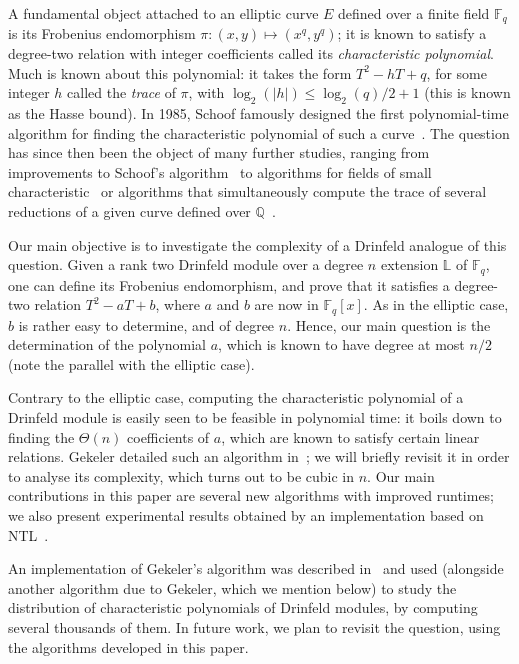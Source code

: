 \documentclass[sigconf]{acmart}
\newcommand{\Q}{\mathbb{Q}}
\newcommand{\F}{\mathbb{F}}
\renewcommand{\L}{\mathbb{L}}
\begin{document}
A fundamental object attached to an elliptic curve $E$ defined over a
finite field $\F_q$ is its Frobenius endomorphism $\pi:(x,y) \mapsto
(x^q,y^q)$; it is known to satisfy a degree-two relation with integer
coefficients called its {\em characteristic polynomial}. Much is known
about this polynomial: it takes the form $T^2 - h T + q$, for some
integer $h$ called the {\em trace} of $\pi$, with $\log_2(|h|) \le
\log_2(q)/2 + 1$ (this is known as the Hasse bound). In 1985, Schoof
famously designed the first polynomial-time algorithm for finding the
characteristic polynomial of such a curve~\cite{schoof85}. The
question has since then been the object of many further studies,
ranging from improvements to Schoof's
algorithm~\cite{Atkin92b,Elkies92} to algorithms for fields of small
characteristic~\cite{Satoh00} or algorithms that simultaneously
compute the trace of several reductions of a given curve defined over
$\Q$~\cite{Harvey14}.

Our main objective is to investigate the complexity of a Drinfeld
analogue of this question. Given a rank two Drinfeld module over a
degree $n$ extension $\L$ of $\F_q$, one can define its Frobenius
endomorphism, and prove that it satisfies a degree-two relation $T^2 -
a T + b$, where $a$ and $b$ are now in $\F_q[x]$. As in the elliptic
case, $b$ is rather easy to determine, and of degree $n$. Hence, our
main question is the determination of the polynomial $a$, which is
known to have degree at most $n/2$ (note the parallel with the
elliptic case).

Contrary to the elliptic case, computing the characteristic polynomial
of a Drinfeld module is easily seen to be feasible in polynomial time:
it boils down to finding the $\Theta(n)$ coefficients of $a$, which
are known to satisfy certain linear relations. Gekeler detailed such
an algorithm in~\cite{GEKELE1991187}; we will briefly revisit it in
order to analyse its complexity, which turns out to be cubic in
$n$. Our main contributions in this paper are several new algorithms
with improved runtimes; we also present experimental results obtained
by an implementation based on NTL~\cite{shoup2001ntl}.

An implementation of Gekeler's algorithm was described
in~\cite{Jung00} and used (alongside another algorithm due to Gekeler,
which we mention below) to study the distribution of characteristic
polynomials of Drinfeld modules, by computing several thousands of
them. In future work, we plan to revisit the question, using the
algorithms developed in this paper.
\end{document}
